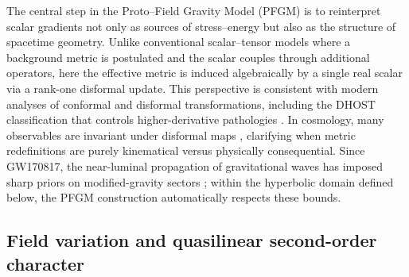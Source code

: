 \documentclass{article}
\begin{document}
The central step in the Proto–Field Gravity Model (PFGM) is to reinterpret scalar gradients not only as sources of stress–energy but also as the structure of spacetime geometry. Unlike conventional scalar–tensor models where a background metric is postulated and the scalar couples through additional operators, here the effective metric is induced algebraically by a single real scalar via a rank-one disformal update. This perspective is consistent with modern analyses of conformal and disformal transformations, including the DHOST classification that controls higher-derivative pathologies \cite{Zumalacarregui2014,Langlois2019,Langlois2018}. In cosmology, many observables are invariant under disformal maps \cite{Domenech2015,Tsujikawa2015,Papadopoulos2017}, clarifying when metric redefinitions are purely kinematical versus physically consequential. Since GW170817, the near-luminal propagation of gravitational waves has imposed sharp priors on modified-gravity sectors \cite{Baker2017,Ezquiaga2017}; within the hyperbolic domain defined below, the PFGM construction automatically respects these bounds.

\subsection{Field variation and quasilinear second-order character}
\label{sec:eom-secondorder}
\end{document}
